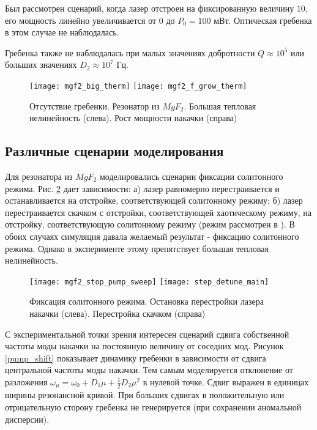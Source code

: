 Был рассмотрен сценарий, когда лазер отстроен на фиксированную величину $10$, его мощность линейно увеличивается от 0 до $P_0=100$ мВт. Оптическая гребенка в этом случае не наблюдалась.

Гребенка также не наблюдалась при малых значениях добротности $Q\approx10^5$ или больших значениях $D_2\approx10^7$ Гц.

\begin{figure}
  \texttt{[image: mgf2\_big\_therm]}
  \texttt{[image: mgf2\_f\_grow\_therm]}
  \caption{Отсутствие гребенки. Резонатор из $MgF_2$. Большая тепловая нелинейность (слева). Рост мощности накачки (справа)} \label{no_comb}
\end{figure}

\subsection{Различные сценарии моделирования}

Для резонатора из $MgF_2$ моделировались сценарии фиксации солитонного режима. Рис. \ref{step_detune} дает зависимости: а) лазер равномерно перестраивается и останавливается на отстройке, соответствующей солитонному режиму; б) лазер перестраивается скачком с отстройки, соответствующей хаотическому режиму, на отстройку, соответствующую солитонному режиму (режим рассмотрен в \cite{Matsko2013}). В обоих случаях симуляция давала желаемый результат - фиксацию солитонного режима. Однако в эксперименте этому препятствует большая тепловая нелинейность.

\begin{figure}
  \texttt{[image: mgf2\_stop\_pump\_sweep]}
  \texttt{[image: step\_detune\_main]}
  \caption{Фиксация солитонного режима. Остановка перестройки лазера накачки (слева). Перестройка скачком (справа)} \label{step_detune}
\end{figure}

С экспериментальной точки зрения интересен сценарий сдвига собственной частоты моды накачки на постоянную величину от соседних мод. Рисунок \ref{pump_shift} показывает динамику гребенки в зависимости от сдвига центральной частоты моды накачки. Тем самым моделируется отклонение от разложения $\omega_\mu=\omega_0+D_1\mu+\frac{1}{2}D_2\mu^2$ в нулевой точке. Сдвиг выражен в единицах ширины резонансной кривой. При больших сдвигах в положительную или отрицательную сторону гребенка не генерируется (при сохранении аномальной дисперсии).

